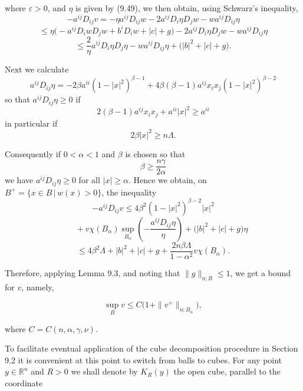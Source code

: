 


where $\varepsilon > 0$, and $\eta$ is given by (9.49), we then obtain, using Schwarz's inequality,
\[
-a^{ij}D_{ij}v = -\eta a^{ij}D_{ij}w - 2a^{ij}D_i\eta D_j w - wa^{ij}D_{ij}\eta
\]
\[
\le \eta\bigl(-a^{ij}D_i w D_j w + b^i D_i w + |c| + g\bigr)
- 2a^{ij}D_i\eta D_j w - wa^{ij}D_{ij}\eta
\]
\[
\le \frac{2}{\eta}a^{ij}D_i\eta D_j\eta - wa^{ij}D_{ij}\eta + \bigl(|b|^2 + |c| + g\bigr).
\]

\medskip

\noindent Next we calculate
\[
a^{ij}D_{ij}\eta = -2\beta a^{ii}(1 - |x|^2)^{\beta-1}
+ 4\beta(\beta - 1)a^{ij}x_i x_j(1 - |x|^2)^{\beta-2}
\]
\noindent so that $a^{ij}D_{ij}\eta \ge 0$ if
\[
2(\beta - 1)a^{ij}x_i x_j + a^{ii}|x|^2 \ge a^{ii}
\]
\noindent in particular if
\[
2\beta |x|^2 \ge n\Lambda.
\]

\medskip

\noindent Consequently if $0 < \alpha < 1$ and $\beta$ is chosen so that
\[
\beta \ge \frac{n\gamma}{2\alpha}
\]
\noindent we have $a^{ij}D_{ij}\eta \ge 0$ for all $|x| \ge \alpha$. Hence we obtain, on $B^+ = \{x\in B\,|\,w(x) > 0\}$,
the inequality
\[
-a^{ij}D_{ij}v \le 4\beta^2(1 - |x|^2)^{\beta-2}|x|^2
\]
\[
\qquad + v\chi(B_\alpha)\sup_{B_\alpha}\left(-\frac{a^{ij}D_{ij}\eta}{\eta}\right) + \bigl(|b|^2 + |c| + g\bigr)\eta
\]
\[
\le 4\beta^2 \Lambda + |b|^2 + |c| + g + \frac{2n\beta \Lambda}{1 - \alpha^2}v\chi(B_\alpha).
\]

\medskip

\noindent Therefore, applying Lemma 9.3, and noting that $\|g\|_{n;B} \le 1$, we get a bound for $v$,
\noindent namely,

\begin{equation}\tag{9.54}
\sup_B v \le C\bigl(1 + \|v^+\|_{n;B_\alpha}\bigr),
\end{equation}

\noindent where $C = C(n,\alpha,\gamma,\nu)$.

\medskip

\noindent To facilitate eventual application of the cube decomposition procedure in
Section 9.2 it is convenient at this point to switch from balls to cubes. For any point
$y \in \mathbb{R}^n$ and $R > 0$ we shall denote by $K_R(y)$ the open cube, parallel to the coordinate





